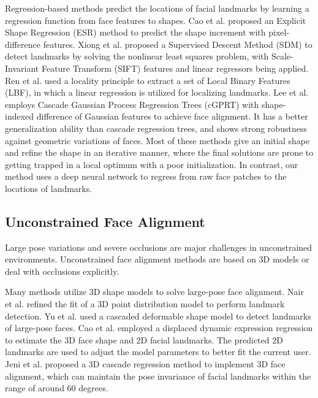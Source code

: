 \documentclass[journal]{IEEEtran}
\begin{document}
Regression-based methods predict the locations of facial landmarks by learning a regression function from face features to shapes. Cao et al. \cite{cao2012face} proposed an Explicit Shape Regression (ESR) method to predict the shape increment with pixel-difference features. Xiong et al. \cite{xiong2013supervised} proposed a Supervised Descent Method (SDM) to detect landmarks by solving the nonlinear least squares problem, with Scale-Invariant Feature Transform (SIFT) \cite{lowe2004distinctive} features and linear regressors being applied. Ren et al. \cite{ren2014face} used a locality principle to extract a set of Local Binary Features (LBF), in which a linear regression is utilized for localizing landmarks. Lee et al. \cite{lee2015face} employs Cascade Gaussian Process Regression Trees (cGPRT) with shape-indexed difference of Gaussian features to achieve face alignment. It has a better generalization ability than cascade regression trees, and shows strong robustness against geometric variations of faces. Most of these methods give an initial shape and refine the shape in an iterative manner, where the final solutions are prone to getting trapped in a local optimum with a poor initialization. In contrast, our method uses a deep neural network to regress from raw face patches to the locations of landmarks.

\subsection{Unconstrained Face Alignment}

Large pose variations and severe occlusions are major challenges in unconstrained environments. Unconstrained face alignment methods are based on 3D models or deal with occlusions explicitly.

Many methods utilize 3D shape models to solve large-pose face alignment. Nair et al. \cite{nair20093} refined the fit of a 3D point distribution model to perform landmark detection. Yu et al. \cite{yu2013pose} used a cascaded deformable shape model to detect landmarks of large-pose faces. Cao et al. \cite{cao2014displaced} employed a displaced dynamic expression regression to estimate the 3D face shape and 2D facial landmarks. The predicted 2D landmarks are used to adjust the model parameters to better fit the current user. Jeni et al. \cite{jeni2015dense} proposed a 3D cascade regression method to implement 3D face alignment, which can maintain the pose invariance of facial landmarks within the range of around $60$ degrees.
\end{document}
